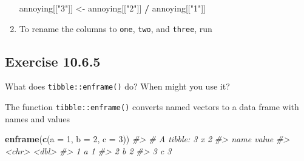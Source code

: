 \documentclass[]{book}
\newenvironment{Shaded}{\begin{snugshade}}{\end{snugshade}}
\newcommand{\CommentTok}[1]{\textcolor[rgb]{0.56,0.35,0.01}{\textit{#1}}}
\newcommand{\DataTypeTok}[1]{\textcolor[rgb]{0.13,0.29,0.53}{#1}}
\newcommand{\DecValTok}[1]{\textcolor[rgb]{0.00,0.00,0.81}{#1}}
\newcommand{\KeywordTok}[1]{\textcolor[rgb]{0.13,0.29,0.53}{\textbf{#1}}}
\newcommand{\NormalTok}[1]{#1}
\newcommand{\OperatorTok}[1]{\textcolor[rgb]{0.81,0.36,0.00}{\textbf{#1}}}
\newcommand{\StringTok}[1]{\textcolor[rgb]{0.31,0.60,0.02}{#1}}
\theoremstyle{plain}
\theoremstyle{remark}
\begin{document}
\begin{enumerate}
\begin{Shaded}
\begin{Highlighting}[]
\NormalTok{annoying[[}\StringTok{"3"}\NormalTok{]] <-}\StringTok{ }\NormalTok{annoying[[}\StringTok{"2"}\NormalTok{]] }\OperatorTok{/}\StringTok{ }\NormalTok{annoying[[}\StringTok{"1"}\NormalTok{]]}
\end{Highlighting}
\end{Shaded}
\item
  To rename the columns to \texttt{one}, \texttt{two}, and \texttt{three}, run

\begin{Shaded}
\end{Shaded}
\end{enumerate}

\hypertarget{exercise-10.6.5}{%
\subsection*{\texorpdfstring{Exercise {10.6.5}}{Exercise 10.6.5}}\label{exercise-10.6.5}}

What does \texttt{tibble::enframe()} do? When might you use it?

The function \texttt{tibble::enframe()} converts named vectors to a data frame with names and values

\begin{Shaded}
\begin{Highlighting}[]
\KeywordTok{enframe}\NormalTok{(}\KeywordTok{c}\NormalTok{(}\DataTypeTok{a =} \DecValTok{1}\NormalTok{, }\DataTypeTok{b =} \DecValTok{2}\NormalTok{, }\DataTypeTok{c =} \DecValTok{3}\NormalTok{))}
\CommentTok{#> # A tibble: 3 x 2}
\CommentTok{#>   name  value}
\CommentTok{#>   <chr> <dbl>}
\CommentTok{#> 1 a         1}
\CommentTok{#> 2 b         2}
\CommentTok{#> 3 c         3}
\end{Highlighting}
\end{Shaded}
\end{document}
